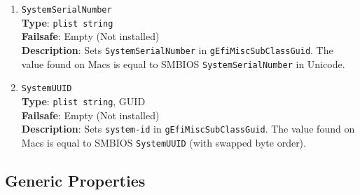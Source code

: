 \documentclass[]{article}
\begin{document}
\begin{enumerate}
  \textbf{Description}: Sets \texttt{Model} in
  \texttt{gEfiMiscSubClassGuid}. The value found on Macs is equal to SMBIOS
  \texttt{SystemProductName} in Unicode.
\item
  \texttt{SystemSerialNumber}\\
  \textbf{Type}: \texttt{plist\ string}\\
  \textbf{Failsafe}: Empty (Not installed)\\
  \textbf{Description}: Sets \texttt{SystemSerialNumber} in
  \texttt{gEfiMiscSubClassGuid}. The value found on Macs is equal to SMBIOS
  \texttt{SystemSerialNumber} in Unicode.
\item
  \texttt{SystemUUID}\\
  \textbf{Type}: \texttt{plist\ string}, GUID\\
  \textbf{Failsafe}: Empty (Not installed)\\
  \textbf{Description}: Sets \texttt{system-id} in
  \texttt{gEfiMiscSubClassGuid}. The value found on Macs is equal to SMBIOS
  \texttt{SystemUUID} (with swapped byte order).
\end{enumerate}

\subsection{Generic Properties}\label{platforminfogeneric}
\end{document}
